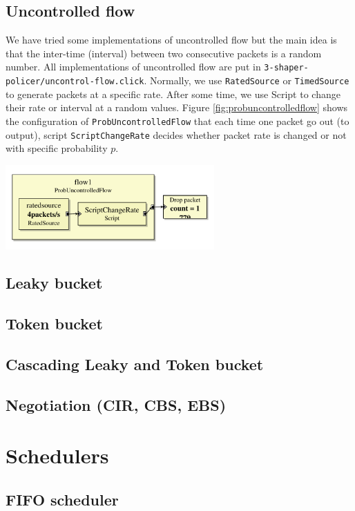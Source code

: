 \documentclass[a4paper]{article}
\begin{document}
  \subsection{Uncontrolled flow}
  We have tried some implementations of uncontrolled flow but the main idea is that the inter-time (interval) between two consecutive packets is a random
  number. All implementations of uncontrolled flow are put in \texttt{3-shaper-policer/uncontrol-flow.click}. Normally, we use \texttt{RatedSource} or \texttt{TimedSource} to generate packets at a specific rate. After some time, we use Script to change their rate or interval at a random values. Figure \ref{fig:probuncontrolledflow} shows the configuration of \texttt{ProbUncontrolledFlow} that each time one packet go out (to output), script \texttt{ScriptChangeRate} decides whether packet rate is changed or not with specific probability $p$.
  \begin{center}
	\includegraphics[width=0.60\textwidth]{probuncontrolledflow}
	\label{fig:probuncontrolledflow}
  \end{center}
  \subsection{Leaky bucket}
  
  \subsection{Token bucket}
  \subsection{Cascading Leaky and Token bucket}
  \subsection{Negotiation (CIR, CBS, EBS)}
  \section{Schedulers}
  \subsection{FIFO scheduler}
\end{document}
